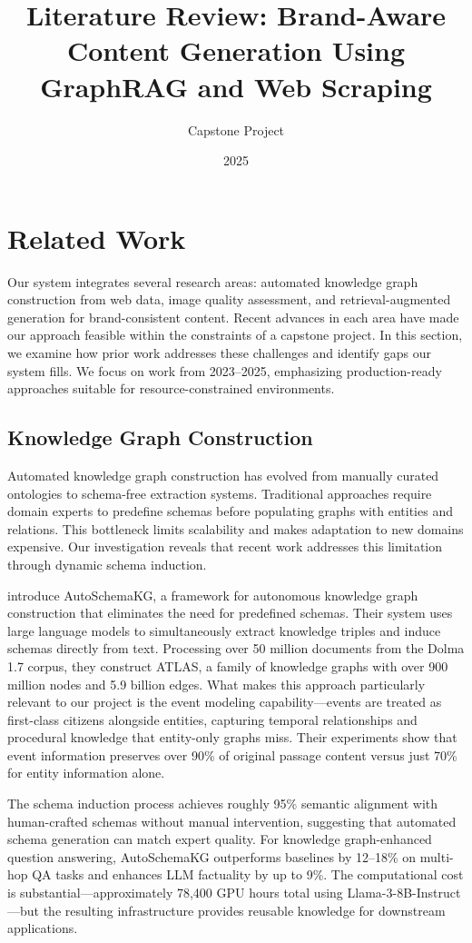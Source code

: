 \documentclass[11pt, twocolumn]{article}
\title{Literature Review: Brand-Aware Content Generation Using GraphRAG and Web Scraping}
\author{Capstone Project}
\date{2025}
\begin{document}
\maketitle

\section{Related Work}

Our system integrates several research areas: automated knowledge graph construction from web data, image quality assessment, and retrieval-augmented generation for brand-consistent content. Recent advances in each area have made our approach feasible within the constraints of a capstone project. In this section, we examine how prior work addresses these challenges and identify gaps our system fills. We focus on work from 2023--2025, emphasizing production-ready approaches suitable for resource-constrained environments.

\subsection{Knowledge Graph Construction}

Automated knowledge graph construction has evolved from manually curated ontologies to schema-free extraction systems. Traditional approaches require domain experts to predefine schemas before populating graphs with entities and relations. This bottleneck limits scalability and makes adaptation to new domains expensive. Our investigation reveals that recent work addresses this limitation through dynamic schema induction.

\cite{Bai2025} introduce AutoSchemaKG, a framework for autonomous knowledge graph construction that eliminates the need for predefined schemas. Their system uses large language models to simultaneously extract knowledge triples and induce schemas directly from text. Processing over 50 million documents from the Dolma 1.7 corpus, they construct ATLAS, a family of knowledge graphs with over 900 million nodes and 5.9 billion edges. What makes this approach particularly relevant to our project is the event modeling capability---events are treated as first-class citizens alongside entities, capturing temporal relationships and procedural knowledge that entity-only graphs miss. Their experiments show that event information preserves over 90\% of original passage content versus just 70\% for entity information alone.

The schema induction process achieves roughly 95\% semantic alignment with human-crafted schemas without manual intervention, suggesting that automated schema generation can match expert quality. For knowledge graph-enhanced question answering, AutoSchemaKG outperforms baselines by 12--18\% on multi-hop QA tasks and enhances LLM factuality by up to 9\%. The computational cost is substantial---approximately 78,400 GPU hours total using Llama-3-8B-Instruct---but the resulting infrastructure provides reusable knowledge for downstream applications.
\end{document}
